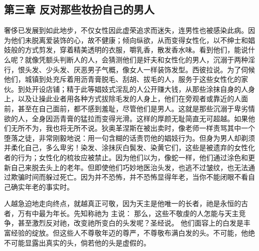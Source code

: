 \subsection{第三章 反对那些妆扮自己的男人}

奢侈已发展到如此地步，不仅女性因此虚荣追求而迷失，连男性也被感染此病。因为他们未脱离爱装饰的心，故不健康；倾向纵欲，从而变得女性化，以不绅士和娼妓般的方式剪发，穿着精美透明的衣服，嚼乳香，散发香水味。看到他们，能说什么呢？就像凭额头判断人的人，会猜测他们是奸夫和女性化的男人，沉溺于两种淫行，恨头发、少头发、厌恶男子气概，像女人一样装饰发型。西彼拉说。为了伺候他们，城镇到处充斥着用沥青膏脱毛、刮胡、拔毛的人，服务于这些女性化的家伙。到处开设店铺；精于此等娼妓式淫乱的人公开赚大钱，从那些涂抹自身的人身上，以及让操此业者用各种方式拔除毛发的人身上，他们在旁观者或靠近的人面前，甚至在自己面前，都不感到羞耻，尽管他们是男人。这就是那些沉溺于卑劣情欲的人，全身因沥青膏的猛拉而变得光滑。这样的厚颜无耻简直无可超越。如果他们无所不为，我也将无所不说。狄奥革涅斯在被出卖时，像老师一样责骂其中一个堕落之徒，非常刚毅地说：用一句含糊的话责罚他的娼妓行为。但身为男人却剃须并柔化自己，多么卑劣！染发、涂抹灰白鬓发、染黄它们，这些是被遗弃的女性化者的行为；女性化的梳妆应被禁止。因为他们以为，像蛇一样，他们通过涂色和更新自己来脱去头上的老年。但即使他们巧妙地医治头发，也逃不过皱纹，也无法通过欺骗时间而躲过死亡。因为并不恐怖，并不恐怖显得年老，当你不能闭眼不看自己确实年老的事实时。\par

人越急迫地走向终点，就越真正可敬，因为天主是他唯一的长者，祂是永恒的古者，万有中最为年长。先知称祂为 主说：  那么，这些不敬虔的人怎能与天主竞争，甚至激烈反对祂，改变祂所变白的头发呢？圣经说。 他们面容上的白发是丰富经验的绽放。但这些人不尊敬年迈的尊严，不尊敬布满白发的头。不可能，他绝不可能显露出真实的头，倘若他的头是虚假的。 \par

